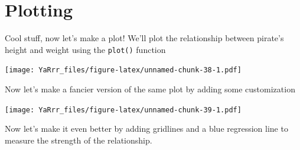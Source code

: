 \documentclass[]{book}
\newenvironment{Shaded}{\begin{snugshade}}{\end{snugshade}}
\newcommand{\KeywordTok}[1]{\textcolor[rgb]{0.13,0.29,0.53}{\textbf{#1}}}
\newcommand{\DataTypeTok}[1]{\textcolor[rgb]{0.13,0.29,0.53}{#1}}
\newcommand{\DecValTok}[1]{\textcolor[rgb]{0.00,0.00,0.81}{#1}}
\newcommand{\StringTok}[1]{\textcolor[rgb]{0.31,0.60,0.02}{#1}}
\newcommand{\CommentTok}[1]{\textcolor[rgb]{0.56,0.35,0.01}{\textit{#1}}}
\newcommand{\OperatorTok}[1]{\textcolor[rgb]{0.81,0.36,0.00}{\textbf{#1}}}
\newcommand{\NormalTok}[1]{#1}
\theoremstyle{definition}
\theoremstyle{definition}
\theoremstyle{remark}
\begin{document}
\section{Plotting}\label{plotting}

Cool stuff, now let's make a plot! We'll plot the relationship between
pirate's height and weight using the \texttt{plot()} function

\begin{Shaded}
\end{Shaded}

\texttt{[image: YaRrr\_files/figure-latex/unnamed-chunk-38-1.pdf]}

Now let's make a fancier version of the same plot by adding some
customization

\begin{Shaded}
\end{Shaded}

\texttt{[image: YaRrr\_files/figure-latex/unnamed-chunk-39-1.pdf]}

Now let's make it even better by adding gridlines and a blue regression
line to measure the strength of the relationship.
\end{document}
